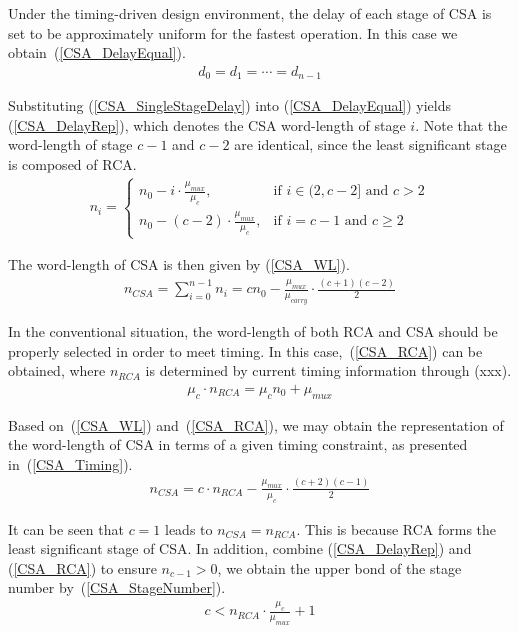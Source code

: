 \documentclass[journal]{IEEEtran}
\begin{document}
Under the timing-driven design environment, the delay of each stage of CSA is set to be approximately uniform for the fastest operation. In this case we obtain~(\ref{CSA_DelayEqual}).
\begin{eqnarray}\label{CSA_DelayEqual}
  d_0=d_1=\cdots=d_{n-1}
\end{eqnarray}

Substituting (\ref{CSA_SingleStageDelay}) into (\ref{CSA_DelayEqual}) yields (\ref{CSA_DelayRep}), which denotes the CSA word-length of stage $i$. Note that the word-length of stage $c-1$ and $c-2$ are identical, since the least significant stage is composed of RCA.
\begin{eqnarray}\label{CSA_DelayRep}
 n_i=\left\{
	\begin{matrix}
	  n_0-i\cdot\frac{\mu_{mux}}{\mu_c}, & \textrm{if $i\in(2,c-2]$ and $c>2$}\\
	  n_0-(c-2)\cdot\frac{\mu_{mux}}{\mu_c}, & \textrm{if $i=c-1$ and $c\geqslant2$}
	\end{matrix}
    \right.
\end{eqnarray}

The word-length of CSA is then given by (\ref{CSA_WL}).
\begin{eqnarray}\label{CSA_WL}
  n_{CSA}=\sum_{i=0}^{n-1}n_{i}=cn_{0}-\frac{\mu_{mux}}{\mu_{carry}}\cdot\frac{(c+1)(c-2)}{2}
\end{eqnarray}

In the conventional situation, the word-length of both RCA and CSA should be properly selected in order to meet timing. In this case,~(\ref{CSA_RCA}) can be obtained, where $n_{RCA}$ is determined by current timing information through (xxx).
\begin{eqnarray}\label{CSA_RCA}
  \mu_{c}\cdot n_{RCA}=\mu_{c}n_0+\mu_{mux}
\end{eqnarray}

Based on~(\ref{CSA_WL}) and~(\ref{CSA_RCA}), we may obtain the representation of the word-length of CSA in terms of a given timing constraint, as presented in~(\ref{CSA_Timing}).
\begin{eqnarray}\label{CSA_Timing}
  n_{CSA}=c\cdot n_{RCA}-\frac{\mu_{mux}}{\mu_{c}}\cdot\frac{(c+2)(c-1)}{2}
\end{eqnarray}

It can be seen that $c=1$ leads to $n_{CSA}=n_{RCA}$. This is because RCA forms the least significant stage of CSA. In addition, combine (\ref{CSA_DelayRep}) and (\ref{CSA_RCA}) to ensure $n_{c-1}>0$, we obtain the upper bond of the stage number by~(\ref{CSA_StageNumber}).
\begin{eqnarray}\label{CSA_StageNumber}
  c<n_{RCA}\cdot\frac{\mu_c}{\mu_{mux}}+1
\end{eqnarray}
\end{document}
